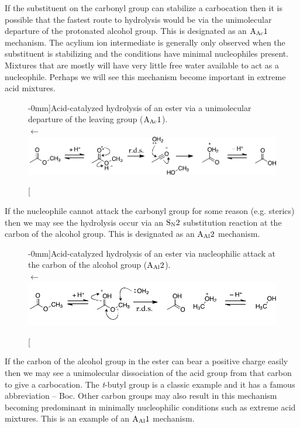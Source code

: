 \documentclass[]{tufte-handout}
\begin{document}
If the substituent on the carbonyl group can stabilize a carbocation then it is possible that the fastest route to hydrolysis would be via the unimolecular departure of the protonated alcohol group. This is designated as an $\rm A_{Ac}1$ mechanism. The acylium ion intermediate is generally only observed when the substituent is stabilizing and the conditions have minimal nucleophiles present. Mixtures that are mostly  will have very little free water available to act as a nucleophile. Perhaps we will see this mechanism become important in extreme acid mixtures.

\begin{figure}[h!]
  \centering
  \caption[][-0mm]{Acid-catalyzed hydrolysis of an ester via a unimolecular departure of the leaving group ($\rm A_{Ac}1$).\\ $\longleftarrow$} 
  \includegraphics[scale=0.7]{images/AAc1}
  \label{fig:fig2}
\end{figure}

If the nucleophile cannot attack the carbonyl group for some reason (e.g. sterics) then we may see the hydrolysis occur via an $\rm S_N2$ substitution reaction at the carbon of the alcohol group. This is designated as an $\rm A_{Al}2$ mechanism.

\begin{figure}[h!]
  \centering
  \caption[][-0mm]{Acid-catalyzed hydrolysis of an ester via nucleophilic attack at the carbon of the alcohol group ($\rm A_{Al}2$).\\ $\longleftarrow$} 
  \includegraphics[scale=0.7]{images/AAl2}
  \label{fig:fig3}
\end{figure}

If the carbon of the alcohol group in the ester can bear a positive charge easily then we may see a unimolecular dissociation of the acid group from that carbon to give a carbocation. The \emph{t}-butyl group is a classic example and it has a famous abbreviation -- Boc. Other carbon groups may also result in this mechanism becoming predominant in minimally nucleophilic conditions such as extreme acid mixtures. This is an example of an $\rm A_{Al}1$ mechanism.
\end{document}
